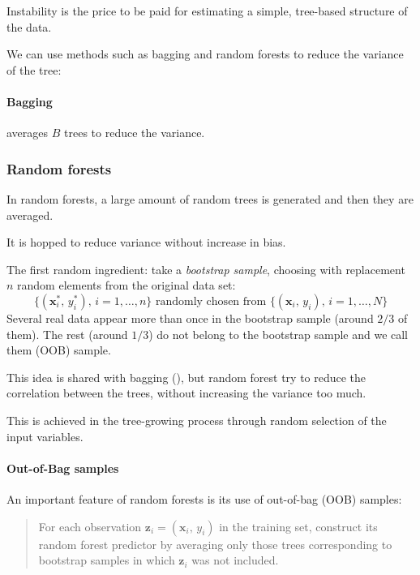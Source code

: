 Instability is the price to be paid for estimating a simple, tree-based structure of the
data.

We can use methods such as bagging and random forests to reduce the variance of the tree:

\paragraph{Bagging} averages $B$ trees to reduce the variance.


\subsubsection{Random forests}

In random forests, a large amount of random trees is generated and then they
are averaged.

It is hopped to reduce variance without increase in bias.

The first random ingredient: take a \emph{bootstrap sample}, choosing with
replacement $n$ random elements from the original data set:
\begin{equation*}
	\{
	(
	\boldsymbol x_i^*,\,y_i^*
	),\, i = 1,\dots,n
	\} \text{ randomly chosen from }
	\{
	(
	\boldsymbol x_i,\,y_i
	),\, i = 1,\dots,N
	\}
\end{equation*}
Several real data appear more than once in the bootstrap sample (around $2/3$ of them).
The rest (around $1/3$) do not belong to the bootstrap sample and we call them
 (OOB) sample.

This idea is shared with bagging (), but
random forest try to reduce the correlation between the trees,
without increasing the variance too much.

This is achieved in the tree-growing process through random selection of the
input variables.

\paragraph{Out-of-Bag samples}
An important feature of random forests is its use of out-of-bag (OOB) samples:
\begin{quote}
	For each observation $\boldsymbol z_i = (\boldsymbol x_i,\,y_i)$ in the
	training set, construct its random forest predictor by averaging only
	those trees corresponding to bootstrap samples in which $\boldsymbol z_i$
	was not included.
\end{quote}


